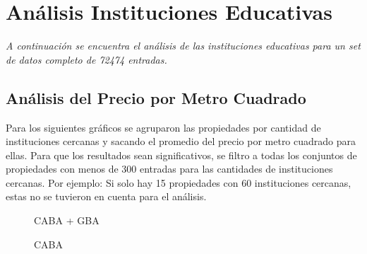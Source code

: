\documentclass[a4paper, 10pt]{article}
\begin{document}
		\section{Análisis Instituciones Educativas}
			\emph{A continuación se encuentra el análisis de las instituciones educativas para un set 
			de datos completo de 72474 entradas.}
			\subsection{Análisis del Precio por Metro Cuadrado}
				Para los siguientes gráficos se agruparon las propiedades por cantidad de instituciones 
				cercanas y sacando el promedio del precio por metro cuadrado para ellas. 
				Para que los resultados sean significativos, 
				se filtro a todas los conjuntos de propiedades con menos de 300 entradas para las 
				cantidades de instituciones cercanas. Por ejemplo: Si solo hay 15 propiedades con 
				60 instituciones cercanas, estas no se tuvieron en cuenta para el análisis.
				\begin{figure}[H]
    				\centering
    				\caption{CABA + GBA}
				\end{figure}
				\begin{figure}[H]
    				\centering
    				\caption{CABA}
				\end{figure}
\end{document}
